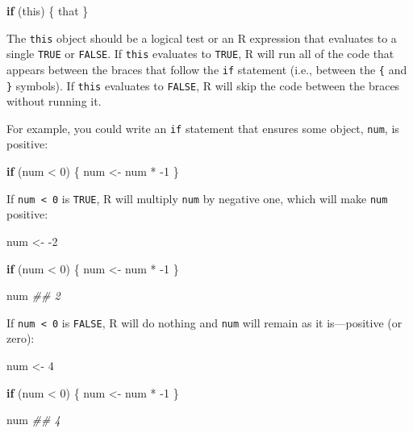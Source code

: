 \documentclass[
  letterpaper,
  DIV=11,
  numbers=noendperiod]{scrbook}
\newenvironment{Shaded}{\begin{snugshade}}{\end{snugshade}}
\newcommand{\ControlFlowTok}[1]{\textcolor[rgb]{0.00,0.23,0.31}{\textbf{#1}}}
\newcommand{\DecValTok}[1]{\textcolor[rgb]{0.68,0.00,0.00}{#1}}
\newcommand{\DocumentationTok}[1]{\textcolor[rgb]{0.37,0.37,0.37}{\textit{#1}}}
\newcommand{\NormalTok}[1]{\textcolor[rgb]{0.00,0.23,0.31}{#1}}
\newcommand{\OtherTok}[1]{\textcolor[rgb]{0.00,0.23,0.31}{#1}}
\newcommand{\SpecialCharTok}[1]{\textcolor[rgb]{0.37,0.37,0.37}{#1}}
\begin{document}
\begin{Shaded}
\begin{Highlighting}[]
\ControlFlowTok{if}\NormalTok{ (this) \{}
\NormalTok{  that}
\NormalTok{\}}
\end{Highlighting}
\end{Shaded}

The \texttt{this} object should be a logical test or an R expression
that evaluates to a single \texttt{TRUE} or \texttt{FALSE}. If
\texttt{this} evaluates to \texttt{TRUE}, R will run all of the code
that appears between the braces that follow the \texttt{if} statement
(i.e., between the \texttt{\{} and \texttt{\}} symbols). If
\texttt{this} evaluates to \texttt{FALSE}, R will skip the code between
the braces without running it.

For example, you could write an \texttt{if} statement that ensures some
object, \texttt{num}, is positive:

\begin{Shaded}
\begin{Highlighting}[]
\ControlFlowTok{if}\NormalTok{ (num }\SpecialCharTok{\textless{}} \DecValTok{0}\NormalTok{) \{}
\NormalTok{  num }\OtherTok{\textless{}{-}}\NormalTok{ num }\SpecialCharTok{*} \SpecialCharTok{{-}}\DecValTok{1}
\NormalTok{\}}
\end{Highlighting}
\end{Shaded}

If \texttt{num\ \textless{}\ 0} is \texttt{TRUE}, R will multiply
\texttt{num} by negative one, which will make \texttt{num} positive:

\begin{Shaded}
\begin{Highlighting}[]
\NormalTok{num }\OtherTok{\textless{}{-}} \SpecialCharTok{{-}}\DecValTok{2}

\ControlFlowTok{if}\NormalTok{ (num }\SpecialCharTok{\textless{}} \DecValTok{0}\NormalTok{) \{}
\NormalTok{  num }\OtherTok{\textless{}{-}}\NormalTok{ num }\SpecialCharTok{*} \SpecialCharTok{{-}}\DecValTok{1}
\NormalTok{\}}

\NormalTok{num}
\DocumentationTok{\#\# 2}
\end{Highlighting}
\end{Shaded}

If \texttt{num\ \textless{}\ 0} is \texttt{FALSE}, R will do nothing and
\texttt{num} will remain as it is---positive (or zero):

\begin{Shaded}
\begin{Highlighting}[]
\NormalTok{num }\OtherTok{\textless{}{-}} \DecValTok{4}

\ControlFlowTok{if}\NormalTok{ (num }\SpecialCharTok{\textless{}} \DecValTok{0}\NormalTok{) \{}
\NormalTok{  num }\OtherTok{\textless{}{-}}\NormalTok{ num }\SpecialCharTok{*} \SpecialCharTok{{-}}\DecValTok{1}
\NormalTok{\}}

\NormalTok{num}
\DocumentationTok{\#\# 4}
\end{Highlighting}
\end{Shaded}
\end{document}
